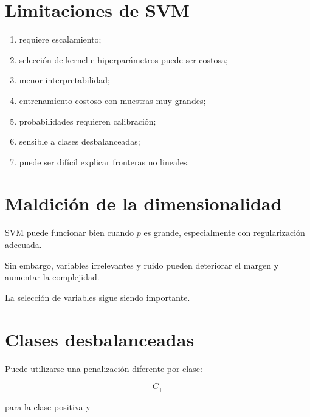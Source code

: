 \documentclass[
  spanish,
  10.5pt,
  letterpaper,
  DIV=11,
  numbers=noendperiod,
  oneside,
  open=any]{scrreprt}
\providecommand{\tightlist}{%
  \setlength{\itemsep}{0pt}\setlength{\parskip}{0pt}}
\theoremstyle{definition}
\theoremstyle{definition}
\theoremstyle{plain}
\theoremstyle{remark}
\begin{document}
\section*{Limitaciones de SVM}\label{limitaciones-de-svm}


\begin{enumerate}
\def\labelenumi{\arabic{enumi}.}
\tightlist
\item
  requiere escalamiento;
\item
  selección de kernel e hiperparámetros puede ser costosa;
\item
  menor interpretabilidad;
\item
  entrenamiento costoso con muestras muy grandes;
\item
  probabilidades requieren calibración;
\item
  sensible a clases desbalanceadas;
\item
  puede ser difícil explicar fronteras no lineales.
\end{enumerate}

\section*{Maldición de la
dimensionalidad}\label{maldiciuxf3n-de-la-dimensionalidad-1}


SVM puede funcionar bien cuando \(p\) es grande, especialmente con
regularización adecuada.

Sin embargo, variables irrelevantes y ruido pueden deteriorar el margen
y aumentar la complejidad.

La selección de variables sigue siendo importante.

\section*{Clases desbalanceadas}\label{clases-desbalanceadas-2}


Puede utilizarse una penalización diferente por clase:

\[
C_+
\]

para la clase positiva y
\end{document}
